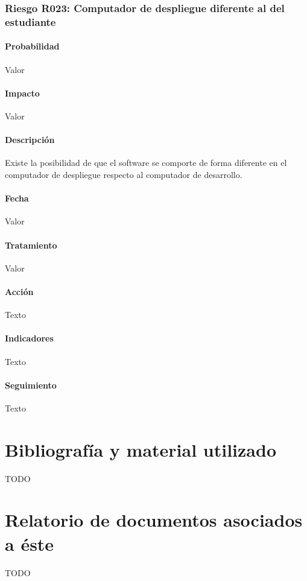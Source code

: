 \documentclass[10pt,a4paper]{article}
\begin{document}
				\subsubsection{Riesgo R023: Computador de despliegue diferente al del estudiante}
				\paragraph{Probabilidad} Valor
				\paragraph{Impacto}	Valor
				\paragraph{Descripción} Existe la posibilidad de que el software se comporte de forma diferente en el computador de despliegue respecto al computador de desarrollo.
				\paragraph{Fecha} Valor %
				\paragraph{Tratamiento} Valor %
				\paragraph{Acción} Texto %
				\paragraph{Indicadores} Texto %
				\paragraph{Seguimiento}	Texto %

				
	\appendix
		\section{Bibliografía y material utilizado}
			TODO %
			
		\section{Relatorio de documentos asociados a éste}
			TODO %
\end{document}
